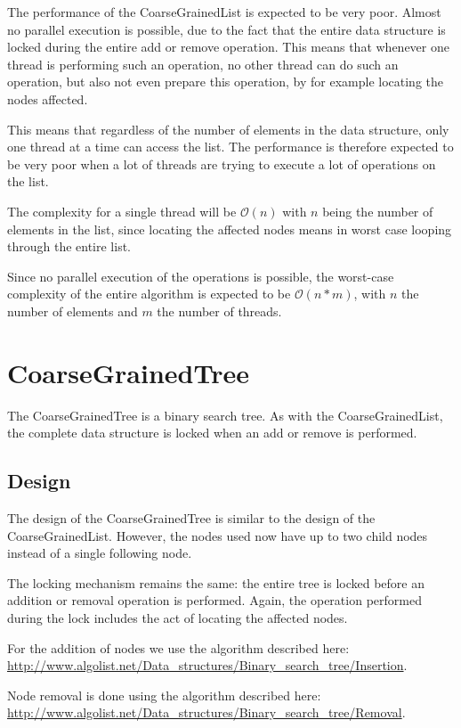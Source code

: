 \documentclass[a4paper]{article}
\def\bigoh{\mathcal{O}}
\begin{document}
The performance of the CoarseGrainedList is expected to be very poor. Almost
no parallel execution is possible, due to the fact that the entire
data structure is locked during the entire add or remove operation. This means
that whenever one thread is performing such an operation, no other thread can
do such an operation, but also not even prepare this operation, by for example
locating the nodes affected.

This means that regardless of the number of elements in the data structure,
only one thread at a time can access the list. The performance is therefore
expected to be very poor when a lot of threads are trying to execute a lot
of operations on the list.

The complexity for a single thread will be $\bigoh(n)$ with $n$ being
the number of elements in the list, since
locating the affected nodes means in worst case looping through the entire
list.

Since no parallel execution of the operations is possible, the worst-case
complexity of the entire algorithm is expected to be $\bigoh(n * m)$,
with $n$ the number of elements and $m$ the number of threads.

\section{CoarseGrainedTree}

The CoarseGrainedTree is a binary search tree. As with the
CoarseGrainedList, the complete data structure is locked when
an add or remove is performed.

\subsection{Design}

The design of the CoarseGrainedTree is similar to the design of the
CoarseGrainedList. However, the nodes used now have up to two child nodes
instead of a single following node.

The locking mechanism remains the same: the entire tree is locked before
an addition or removal operation is performed. Again, the operation performed
during the lock includes the act of locating the affected nodes.

For the addition of nodes we use the algorithm described here: \\
\url{http://www.algolist.net/Data_structures/Binary_search_tree/Insertion}.

Node removal is done using the algorithm described here: \\
\url{http://www.algolist.net/Data_structures/Binary_search_tree/Removal}.
\end{document}
